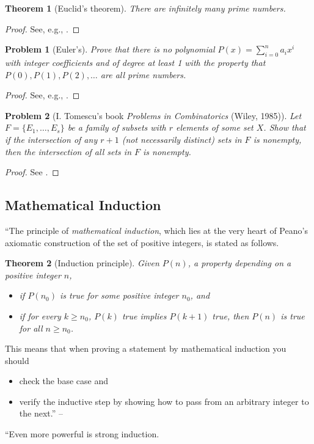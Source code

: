 \documentclass[oneside]{book}
\numberwithin{equation}{section}
\newtheorem{theorem}{Theorem}[section]
\newtheorem{problem}{Problem}[section]
\begin{document}
\begin{theorem}[Euclid's theorem]
	There are infinitely many prime numbers.
\end{theorem}

\begin{proof}[Proof]
	See, e.g., \cite[pp. 1--2]{Gelca_Andreescu2017}.
\end{proof}
 
\begin{problem}[Euler's]
	Prove that there is no polynomial $P(x) = \sum_{i=0}^n a_ix^i$ with integer coefficients and of degree at least 1 with the property that $P(0),P(1),P(2),\ldots$ are all prime numbers.
\end{problem}

\begin{proof}[Proof]
	See, e.g., \cite[p. 2]{Gelca_Andreescu2017}.
\end{proof}

\begin{problem}[I. Tomescu's book \textit{Problems in Combinatorics} (Wiley, 1985)]
	Let $F = \{E_1,\ldots,E_s\}$ be a family of subsets with $r$ elements of some set $X$. Show that if the intersection of any $r + 1$ (not necessarily distinct) sets in $F$ is nonempty, then the intersection of all sets in $F$ is nonempty.
\end{problem}

\begin{proof}[Proof]
	See \cite[p. 2]{Gelca_Andreescu2017}.
\end{proof}

\subsection{Mathematical Induction}
``The principle of \textit{mathematical induction}, which lies at the very heart of Peano's axiomatic construction of the set of positive integers, is stated as follows.

\begin{theorem}[Induction principle]
	Given $P(n)$, a property depending on a positive integer $n$,
	\begin{itemize}
		\item[(i)] if $P(n_0)$ is true for some positive integer $n_0$, and
		\item[(ii)] if for every $k\ge n_0$, $P(k)$ true implies $P(k + 1)$ true, then $P(n)$ is true for all $n\ge n_0$.
	\end{itemize}
\end{theorem}
This means that when proving a statement by mathematical induction you should
\begin{itemize}
	\item[(i)] check the base case and
	\item[(ii)] verify the inductive step by showing how to pass from an arbitrary integer to the next.'' -- \cite[Sect. 1.2, pp. 3--4]{Gelca_Andreescu2017}
\end{itemize}
``Even more powerful is strong induction.
\end{document}
